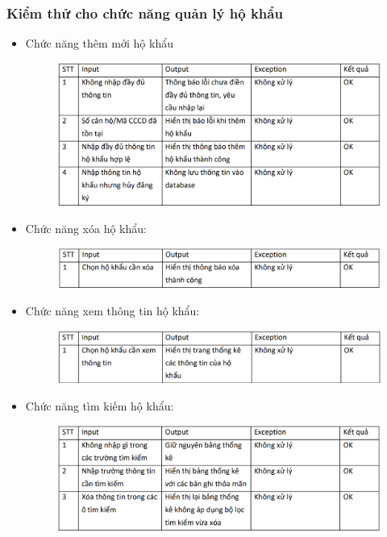 \documentclass{article}
\begin{document}
\subsubsection{Kiểm thử cho chức năng quản lý hộ khẩu}
\begin{itemize}
    \item Chức năng thêm mới hộ khẩu
    \begin{figure}[H]
        \centering
        \includegraphics[width=1\textwidth]{Kiểm thử hộ khẩu/Screenshot 2024-12-14 001936.png}
    \end{figure}
    \item Chức năng xóa hộ khẩu:
    \begin{figure}[H]
        \centering
        \includegraphics[width=1\textwidth]{Kiểm thử hộ khẩu/Screenshot 2024-12-14 001941.png}
    \end{figure}
    \vspace{1cm}
    \item Chức năng xem thông tin hộ khẩu:
    \begin{figure}[H]
        \centering
        \includegraphics[width=1\textwidth]{Kiểm thử hộ khẩu/Screenshot 2024-12-14 001946.png}
    \end{figure}
    \item Chức năng tìm kiếm hộ khẩu:
    \begin{figure}[H]
        \centering
        \includegraphics[width=1\textwidth]{Kiểm thử hộ khẩu/Screenshot 2024-12-14 001954.png}

\end{figure}
\end{itemize}
\end{document}
